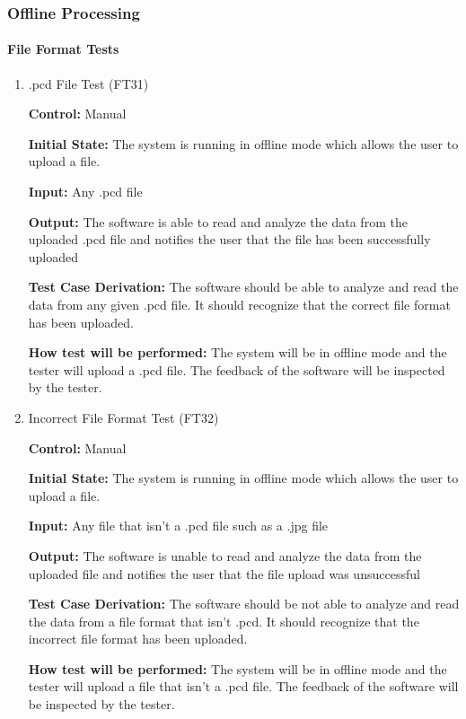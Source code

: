 \documentclass[12pt, titlepage]{article}
\begin{document}
\subsubsection{Offline Processing}

\paragraph{File Format Tests}
\begin{enumerate}
\item{.pcd File Test (FT31)\\}
  
\textbf{Control:} Manual

\textbf{Initial State:} The system is running in offline mode which allows the user to upload a file.

\textbf{Input:} Any .pcd file

\textbf{Output:} The software is able to read and analyze the data from the uploaded .pcd file and notifies the user that the file has been successfully uploaded

\textbf{Test Case Derivation:} The software should be able to analyze and read the data from any given .pcd file. It should recognize that the correct file format has been uploaded.

\textbf{How test will be performed:} The system will be in offline mode and the tester will upload a .pcd file. The feedback of the software will be inspected by the tester.

\item{Incorrect File Format Test (FT32)\\}

\textbf{Control:} Manual

\textbf{Initial State:} The system is running in offline mode which allows the user to upload a file.

\textbf{Input:} Any file that isn’t a .pcd file such as a .jpg file

\textbf{Output:} The software is unable to read and analyze the data from the uploaded file and notifies the user that the file upload was unsuccessful

\textbf{Test Case Derivation:} The software should be not able to analyze and read the data from a file format that isn’t .pcd. It should recognize that the incorrect file format has been uploaded.

\textbf{How test will be performed:} The system will be in offline mode and the tester will upload a file that isn’t a .pcd file. The feedback of the software will be inspected by the tester.

\end{enumerate} 
\end{document}
